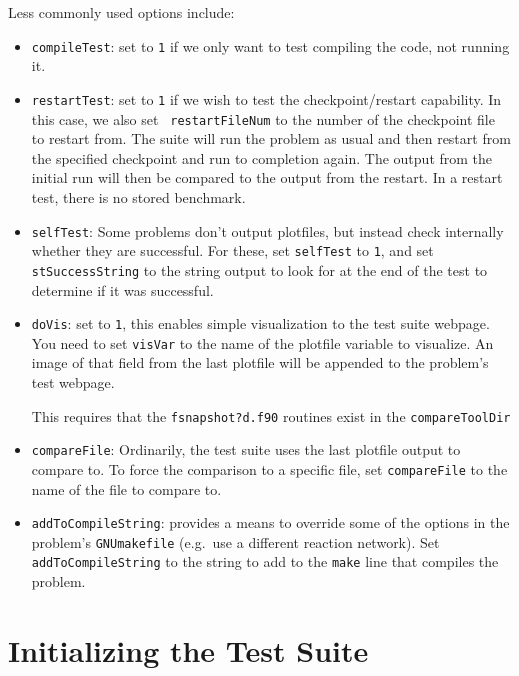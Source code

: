 Less commonly used options include:
\begin{itemize}
\item {\tt compileTest}: set to {\tt 1} if we only want to test compiling
  the code, not running it.

\item {\tt restartTest}: set to {\tt 1} if we wish to test the
  checkpoint/restart capability.  In this case, we also set {\tt
    restartFileNum} to the number of the checkpoint file to restart
  from.  The suite will run the problem as usual and then restart from
  the specified checkpoint and run to completion again.  The output
  from the initial run will then be compared to the output from the
  restart.  In a restart test, there is no stored benchmark.

\item {\tt selfTest}: Some problems don't output plotfiles, but
  instead check internally whether they are successful.  For these,
  set {\tt selfTest} to {\tt 1}, and set {\tt stSuccessString} to the
  string output to look for at the end of the test to determine if it
  was successful.

\item {\tt doVis}: set to {\tt 1}, this enables simple visualization
  to the test suite webpage.  You need to set {\tt visVar} to the name
  of the plotfile variable to visualize.  An image of that field from
  the last plotfile will be appended to the problem's test webpage.

  This requires that the {\tt fsnapshot?d.f90} routines exist in the 
  {\tt compareToolDir}
  
\item {\tt compareFile}: Ordinarily, the test suite uses the last
  plotfile output to compare to.  To force the comparison to a
  specific file, set {\tt compareFile} to the name of the file to
  compare to.

\item {\tt addToCompileString}: provides a means to override some of
  the options in the problem's {\tt GNUmakefile} (e.g.\ use a
  different reaction network).  Set {\tt addToCompileString} to the
  string to add to the {\tt make} line that compiles the problem.
\end{itemize}



\section{Initializing the Test Suite}

